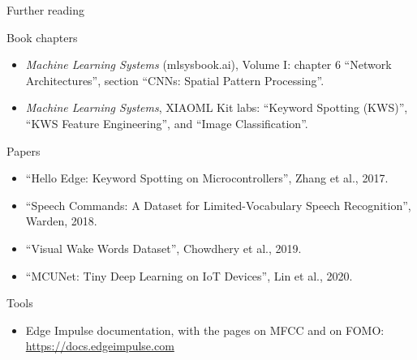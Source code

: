 \begin{frame}{Further reading}
  \footnotesize
  \begin{block}{Book chapters}
    \begin{itemize}
      \item \emph{Machine Learning Systems} (mlsysbook.ai), Volume I: chapter
            6 ``Network Architectures'', section ``CNNs: Spatial Pattern
            Processing''.
      \item \emph{Machine Learning Systems}, XIAOML Kit labs: ``Keyword
            Spotting (KWS)'', ``KWS Feature Engineering'', and ``Image
            Classification''.
    \end{itemize}
  \end{block}
  \begin{block}{Papers}
    \begin{itemize}
      \item ``Hello Edge: Keyword Spotting on Microcontrollers'', Zhang et
            al., 2017.
      \item ``Speech Commands: A Dataset for Limited-Vocabulary Speech
            Recognition'', Warden, 2018.
      \item ``Visual Wake Words Dataset'', Chowdhery et al., 2019.
      \item ``MCUNet: Tiny Deep Learning on IoT Devices'', Lin et al., 2020.
    \end{itemize}
  \end{block}
  \begin{block}{Tools}
    \begin{itemize}
      \item Edge Impulse documentation, with the pages on MFCC and on FOMO:
            \url{https://docs.edgeimpulse.com}
    \end{itemize}
  \end{block}
\end{frame}
